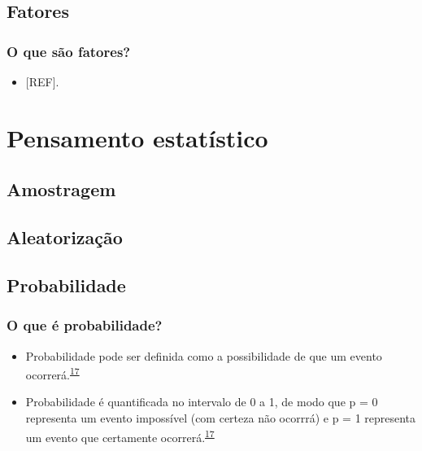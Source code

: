 \documentclass[
]{book}
\providecommand{\tightlist}{%
  \setlength{\itemsep}{0pt}\setlength{\parskip}{0pt}}
\begin{document}
\hypertarget{fatores}{%
\section{Fatores}\label{fatores}}

\hypertarget{o-que-suxe3o-fatores}{%
\subsection{O que são fatores?}\label{o-que-suxe3o-fatores}}

\begin{itemize}
\tightlist
\item
  {[}REF{]}.
\end{itemize}

\hypertarget{questuxf5es-fundamentais}{%
\chapter{\texorpdfstring{\textbf{Pensamento estatístico}}{Pensamento estatístico}}\label{questuxf5es-fundamentais}}

\hypertarget{amostragem}{%
\section{Amostragem}\label{amostragem}}

\hypertarget{aleatorizacao}{%
\section{Aleatorização}\label{aleatorizacao}}

\hypertarget{probabilidade}{%
\section{Probabilidade}\label{probabilidade}}

\hypertarget{o-que-uxe9-probabilidade}{%
\subsection{O que é probabilidade?}\label{o-que-uxe9-probabilidade}}

\begin{itemize}
\item
  Probabilidade pode ser definida como a possibilidade de que um evento ocorrerá.\textsuperscript{\protect\hyperlink{ref-Ali2016}{17}}
\item
  Probabilidade é quantificada no intervalo de 0 a 1, de modo que p = 0 representa um evento impossível (com certeza não ocorrrá) e p = 1 representa um evento que certamente ocorrerá.\textsuperscript{\protect\hyperlink{ref-Ali2016}{17}}
\end{itemize}
\end{document}
